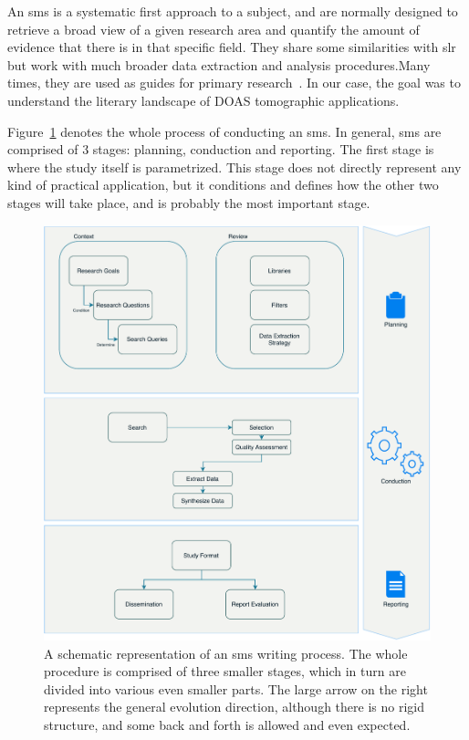 An \gls{sms} is a systematic first approach to a subject, and are
normally designed to retrieve a broad view of a given research area and
quantify the amount of evidence that there is in that specific field.
They share some similarities with \gls{slr} but work with much broader
data extraction and analysis procedures.Many times, they are used as
guides for primary research~\cite{Kitchenham2007}. In our case, the goal
was to understand the literary landscape of \gls{DOAS} tomographic
applications.

Figure~\ref{fig:sms_planning} denotes the whole process of conducting
an \gls{sms}. In general, \acrlong{sms} are comprised of 3 stages:
planning, conduction and reporting. The first stage is where the study
itself is parametrized. This stage does not directly represent any kind
of practical application, but it conditions and defines how the other
two stages will take place, and is probably the most important stage.

\begin{figure}[htpb]
    \centering
    \includegraphics[width=.8\textwidth]{img/pdf/sms_planning.pdf}
    \caption{A schematic representation of an \gls{sms} writing process.
    The whole procedure is comprised of three smaller stages, which in
    turn are divided into various even smaller parts. The large arrow on the
    right represents the general evolution direction, although there is no
    rigid structure, and some back and forth is allowed and even expected.}
    \label{fig:sms_planning}
\end{figure}

